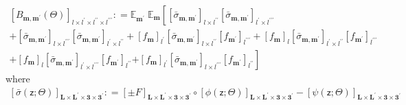 \documentclass[preprint,12pt]{elsarticle}
\newcommand*{\M}[1]{\ensuremath{#1}\xspace}
\newcommand*{\x}{\times}
\newcommand*{\mi}[1]{\mathbf{#1}}
\newcommand*{\rv}[1]{\mathsf{#1}}
\newcommand*{\te}[2][]{\left\lbrack{#2}\right\rbrack_{#1}}
\newcommand*{\deq}{\M{\mathrel{\mathop:}=}}
\newcommand*{\evt}[3][]{\mathbb{E}_{#3}^{#1}\!#2}
\begin{document}
            \begin{multline*}
                \te[l\x l^{\prime}\x l^{\prime\prime}\x l^{\prime\prime\prime}]{B_{\mi{m},\mi{m^{\prime}}}(\Theta)} 
                \deq \evt{\;\evt{\left\lbrack
                \te[l\x l^{\prime\prime}]{\bar{\sigma}_{\mi{m,m^{\prime}}}} \te[l^{\prime}\x l^{\prime\prime\prime}]{\bar{\sigma}_{\mi{m,m^{\prime}}}}\right. \\
                +\te[l\x l^{\prime\prime\prime}]{\bar{\sigma}_{\mi{m,m^{\prime}}}} \te[l^{\prime}\x l^{\prime\prime}]{\bar{\sigma}_{\mi{m,m^{\prime}}}}
                +\te[l^{\prime}]{f_{\mi{m}}} \te[l\x l^{\prime\prime}]{\bar{\sigma}_{\mi{m,m^{\prime}}}} \te[l^{\prime\prime\prime}]{f_{\mi{m^{\prime}}}}
                +\te[l]{f_{\mi{m}}} \te[l^{\prime}\x l^{\prime\prime}]{\bar{\sigma}_{\mi{m,m^{\prime}}}} \te[l^{\prime\prime\prime}]{f_{\mi{m^{\prime}}}}\\
                +\te[l]{f_{\mi{m}}} \te[l^{\prime}\x l^{\prime\prime\prime}]{\bar{\sigma}_{\mi{m,m^{\prime}}}} \te[l^{\prime\prime}]{f_{\mi{m^{\prime}}}}
                \left. +\te[l^{\prime}]{f_{\mi{m}}} \te[l\x l^{\prime\prime\prime}]{\bar{\sigma}_{\mi{m,m^{\prime}}}} \te[l^{\prime\prime}]{f_{\mi{m^{\prime}}}}
                \right\rbrack}{\mi{m}}}{\mi{m^{\prime}}} 
            \end{multline*}
            where
            \begin{multline*}
                \te[\mi{L\x L^{\prime}\x 3\x 3^{\prime}}]{\bar{\sigma}(\rv{z}; \Theta)} \deq
                \te[\mi{L\x L^{\prime}\x 3\x 3^{\prime}}]{\pm F}
                \circ \te[\mi{L\x L^{\prime}\x 3\x 3^{\prime}}]{\phi(\rv{z}; \Theta)} - 
                \te[\mi{L\x L^{\prime}\x 3\x 3^{\prime}}]{\psi(\rv{z}; \Theta)}
            \end{multline*}
\end{document}
